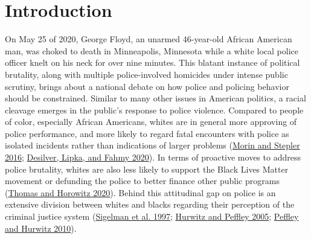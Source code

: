 \documentclass[
  12pt,
]{article}
\begin{document}
\hypertarget{introduction}{%
\section{Introduction}\label{introduction}}

On May 25 of 2020, George Floyd, an unarmed 46-year-old African American
man, was choked to death in Minneapolis, Minnesota while a white local
police officer knelt on his neck for over nine minutes. This blatant
instance of political brutality, along with multiple police-involved
homicides under intense public scrutiny, brings about a national debate
on how police and policing behavior should be constrained. Similar to
many other issues in American politics, a racial cleavage emerges in the
public's response to police violence. Compared to people of color,
especially African Americans, whites are in general more approving of
police performance, and more likely to regard fatal encounters with
police as isolated incidents rather than indications of larger problems
(\protect\hyperlink{ref-morin2016}{Morin and Stepler 2016};
\protect\hyperlink{ref-desilver}{Desilver, Lipka, and Fahmy 2020}). In
terms of proactive moves to address police brutality, whites are also
less likely to support the Black Lives Matter movement or defunding the
police to better finance other public programs
(\protect\hyperlink{ref-thomas}{Thomas and Horowitz 2020}). Behind this
attitudinal gap on police is an extensive division between whites and
blacks regarding their perception of the criminal justice system
(\protect\hyperlink{ref-sigelman1997}{Sigelman et al. 1997};
\protect\hyperlink{ref-hurwitz2005}{Hurwitz and Peffley 2005};
\protect\hyperlink{ref-peffley2010}{Peffley and Hurwitz 2010}).
\end{document}
